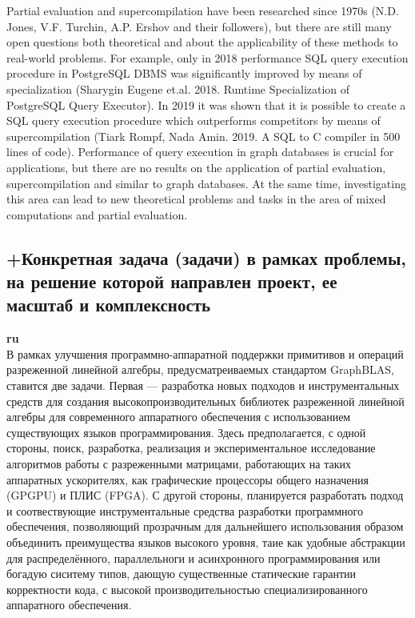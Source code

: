 \documentclass[12pt]{article}  %
\theoremstyle{remark}
\begin{document}
Partial evaluation and supercompilation have been researched since 1970s (N.D. Jones, V.F. Turchin, A.P. Ershov and their followers), but there are still many open questions both theoretical and about the applicability of these methods to real-world problems. For example, only in 2018 performance SQL query execution procedure in PostgreSQL DBMS was significantly improved by means of specialization (Sharygin Eugene et.al. 2018. Runtime Specialization of PostgreSQL Query Executor). In 2019 it was shown that it is possible to create a SQL query execution procedure which outperforms competitors by means of supercompilation (Tiark Rompf, Nada Amin. 2019. A SQL to C compiler in 500 lines of code). Performance of query execution in graph databases is crucial for applications, but there are no results on the application of partial evaluation, supercompilation and similar to graph databases. At the same time, investigating this area can lead to new theoretical problems and tasks in the area of mixed computations and partial evaluation.

\subsection{+Конкретная задача (задачи) в рамках проблемы, на решение которой направлен проект, ее масштаб и комплексность}

\textbf{ru}\\
%
В рамках улучшения программно-аппаратной поддержки примитивов и операций разреженной линейной алгебры, предусматреиваемых стандартом GraphBLAS, ставится две задачи. Первая --- разработка новых подходов и инструментальных средств для создания высокопроизводительных библиотек разреженной линейной алгебры для современного аппаратного обеспечения с использованием существующих языков программирования. Здесь предполагается, с одной стороны, поиск, разработка, реализация и экспериментальное исследование алгоритмов работы с разреженными матрицами, работающих на таких аппаратных ускорителях, как графические процессоры общего назначения (GPGPU) и ПЛИС (FPGA). С другой стороны, планируется разработать подход и соотвествующие инструментальные средства разработки программного обеспечения, позволяющий прозрачным для дальнейшего использования образом объединить преимущества языков высокого уровня, таие как удобные абстракции для распределённого, параллельноги и асинхронного программирования или богадую сиситему типов, дающую существенные статические гарантии корректности кода, с высокой производительностью специализированного аппаратного обеспечения.  
\end{document}
